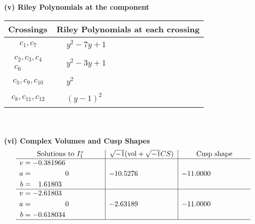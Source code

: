 \documentclass[1p]{elsarticle_modified}
\theoremstyle{definition}
\newcommand{\I}{\sqrt{-1}}
\begin{document}
\newpage\renewcommand{\arraystretch}{1}
\flushleft \textbf{(v) Riley Polynomials at the component}\newline \\
\begin{tabular}{m{50pt}|m{274pt}}
Crossings & \hspace{64pt}Riley Polynomials at each crossing \\
\hline $$\begin{aligned}c_{1},c_{7}\end{aligned}$$&$\begin{aligned}
&y^2-7 y+1
\end{aligned}$\\
\hline $$\begin{aligned}c_{2},c_{3},c_{4}\\c_{6}\end{aligned}$$&$\begin{aligned}
&y^2-3 y+1
\end{aligned}$\\
\hline $$\begin{aligned}c_{5},c_{9},c_{10}\end{aligned}$$&$\begin{aligned}
&y^2
\end{aligned}$\\
\hline $$\begin{aligned}c_{8},c_{11},c_{12}\end{aligned}$$&$\begin{aligned}
&(y-1)^2
\end{aligned}$\\
\hline
\end{tabular}\\~\\
\newpage\flushleft \textbf{(vi) Complex Volumes and Cusp Shapes}
$$\begin{array}{c|c|c}  
\text{Solutions to }I^v_{1}& \I (\text{vol} + \sqrt{-1}CS) & \text{Cusp shape}\\
 \hline 
\begin{aligned}
v &= -0.381966\phantom{ +0.000000I} \\
a &= \phantom{-0.000000 } 0 \\
b &= \phantom{-}1.61803\phantom{ +0.000000I}\end{aligned}
 & -10.5276\phantom{ +0.000000I} & -11.0000\phantom{ +0.000000I} \\ \hline\begin{aligned}
v &= -2.61803\phantom{ +0.000000I} \\
a &= \phantom{-0.000000 } 0 \\
b &= -0.618034\phantom{ +0.000000I}\end{aligned}
 & -2.63189\phantom{ +0.000000I} & -11.0000\phantom{ +0.000000I}\\
 \hline 
 \end{array}$$\newpage
\end{document}
